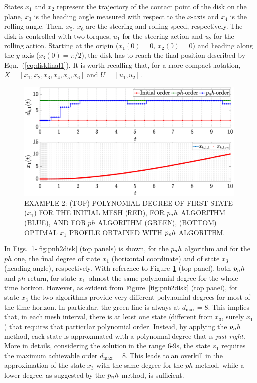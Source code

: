 States $x_1$ and $x_2$ represent the trajectory of the contact point of the disk on the plane, $x_3$ is the heading angle measured with respect to
the $x$-axis and $x_4$ is the rolling angle. Then, $x_5$, $x_6$ are the steering and rolling speed, respectively.
The disk is controlled with two torques, $u_1$ for the steering action and $u_2$ for the rolling action. Starting at the origin ($x_1(0) = 0, \, x_2(0) = 0$) and heading along the $y$-axis ($x_3(0) = \pi/2$), the disk has to reach the final position described by
Eqn.~(\ref{eq:diskfinal1}). It is worth recalling that, for a more compact notation, $X = [x_1, x_2, x_3, x_4, x_5, x_6]$  and $U = [u_1, u_2]$.
\begin{figure}[t]
	\centering
	\includegraphics[trim={1cm 0.1cm 2cm 1.05cm},clip,width=1\columnwidth]{Img/pnh1_disk1}
	\caption{EXAMPLE 2: (TOP) POLYNOMIAL DEGREE OF FIRST STATE ($x_{1}$) FOR THE INITIAL MESH (RED), FOR $p_{n}h$ ALGORITHM (BLUE), AND FOR $ph$ ALGORITHM (GREEN), (BOTTOM)
		OPTIMAL $x_1$ PROFILE OBTAINED WITH $p_{n}h$ ALGORITHM.}
	\label{fig:pnh1disk}
\end{figure}
In Figs.~\ref{fig:pnh1disk}-\ref{fig:pnh2disk} (top panels) is shown, for the $p_{n}h$ algorithm and for the $ph$ one, the final degree of state $x_1$ (horizontal coordinate) and of state $x_3$ (heading angle), respectively.
With reference to Figure~\ref{fig:pnh1disk} (top panel), both $p_{n}h$ and $ph$ return, for state $x_1$, almost the same polynomial degree for the whole time horizon. However, as evident from Figure~\ref{fig:pnh2disk} (top panel), for state $x_3$ the two algorithms provide very different polynomial degrees for most of the time horizon.
In particular, the green line is always at $d_{\max}=8$. This implies that, in each mesh interval, there is at least one state (different from $x_3$, surely $x_1$) that requires that particular polynomial order. Instead, by applying the $p_{n}h$ method, each state is approximated with a polynomial degree that is \emph{just right}.
More in details, considering the solution in the range 6-9s, the state $x_1$ requires the maximum achievable order $d_\text{max} = 8$. This leads to an overkill in the approximation of the state $x_3$ with the same degree for the $ph$ method, while a lower degree, as suggested by the $p_{n}h$ method, is sufficient.

